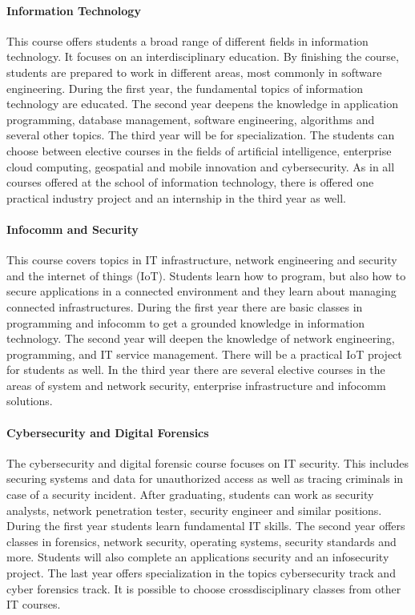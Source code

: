 \paragraph{Information Technology}
This course offers students a broad range of different fields in information technology. It focuses on an interdisciplinary education. By finishing the course, students are prepared to work in different areas, most commonly in software engineering. During the first year, the fundamental topics of information technology are educated. The second year deepens the knowledge in application programming, database management, software engineering, algorithms and several other topics. The third year will be for specialization. The students can choose between elective courses in the fields of artificial intelligence, enterprise cloud computing, geospatial and mobile innovation and cybersecurity. As in all courses offered at the school of information technology, there is offered one practical industry project and an internship in the third year as well.

\paragraph{Infocomm and Security}
This course covers topics in IT infrastructure, network engineering and security and the internet of things (IoT). Students learn how to program, but also how to secure applications in a connected environment and they learn about managing connected infrastructures. During the first year there are basic classes in programming and infocomm to get a grounded knowledge in information technology. The second year will deepen the knowledge of network engineering, programming, and IT service management. There will be a practical IoT project for students as well.
In the third year there are several elective courses in the areas of system and network security, enterprise infrastructure and infocomm solutions.

\paragraph{Cybersecurity and Digital Forensics}
The cybersecurity and digital forensic course focuses on IT security. This includes securing systems and data for unauthorized access as well as tracing criminals in case of a security incident. After graduating, students can work as security analysts, network penetration tester, security engineer and similar positions. During the first year students learn fundamental IT skills. The second year offers classes in forensics, network security, operating systems, security standards and more. Students will also complete an applications security and an infosecurity project.
The last year offers specialization in the topics cybersecurity track and cyber forensics track. It is possible to choose crossdisciplinary classes from other IT courses.

